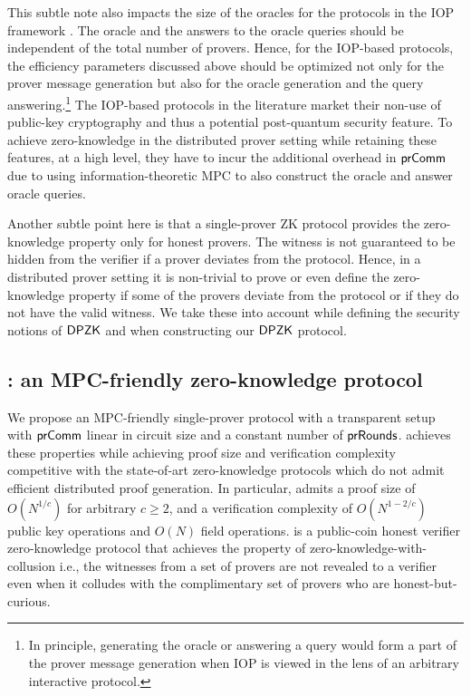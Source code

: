 This subtle note also impacts the size of the oracles for the protocols in the IOP framework \cite{aurora, ligero}. The oracle and the answers to the oracle queries should be independent of the total number of provers. Hence, for the IOP-based protocols, the efficiency parameters discussed above should be optimized not only for the prover message generation but also for the oracle generation and the query answering.\footnote{In principle, generating the oracle or answering a query would form a part of the prover message generation when IOP is viewed in the lens of an arbitrary interactive protocol.}
The IOP-based protocols in the literature \cite{aurora, ligero} market their non-use of public-key cryptography and thus a potential post-quantum security feature. To achieve zero-knowledge in the distributed prover setting while retaining these features, at a high level, they have to incur the additional overhead in $\mathsf{prComm}$ due to using information-theoretic MPC to also construct the oracle and answer oracle queries. %

Another subtle point here is that a single-prover ZK protocol provides the zero-knowledge property only for honest provers. The witness is not guaranteed to be hidden from the verifier if a prover deviates from the protocol. Hence, in a distributed prover setting it is non-trivial to prove or even define the zero-knowledge property if some of the provers deviate from the protocol or if they do not have the valid witness. We take these into account while defining the security notions of $\mathsf{DPZK}$ and when constructing our $\mathsf{DPZK}$ protocol.

\subsection{\name{}: an MPC-friendly zero-knowledge protocol}
We propose an MPC-friendly single-prover protocol \name{} with a transparent setup with $\mathsf{prComm}$ linear in circuit size and a constant number of $\mathsf{prRounds}$.  
\name{} achieves these properties while achieving proof size and verification complexity competitive with the state-of-art zero-knowledge protocols which do not admit efficient distributed proof generation. In particular, \name{} admits a proof size of $O(N^{1/c})$ for arbitrary $c\geq 2$, and a verification complexity of $O(N^{1-2/c})$ public key operations and $O(N)$ field operations. \name{} is a public-coin honest verifier zero-knowledge protocol that achieves the property of zero-knowledge-with-collusion i.e., the witnesses from a set of provers are not revealed to a verifier even when it colludes with the complimentary set of provers who are honest-but-curious.

